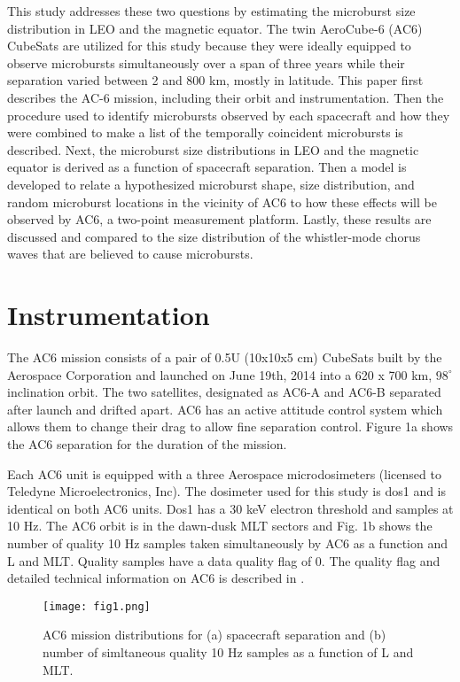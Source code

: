 \documentclass[draft]{agujournal2019}
\begin{document}
This study addresses these two questions by estimating the microburst size distribution in LEO and the magnetic equator. The twin AeroCube-6 (AC6) CubeSats are utilized for this study because they were ideally equipped to observe microbursts simultaneously over a span of three years while their separation varied between 2 and 800 km, mostly in latitude. This paper first describes the AC-6 mission, including their orbit and instrumentation. Then the procedure used to identify microbursts observed by each spacecraft and how they were combined to make a list of the temporally coincident microbursts is described. Next, the microburst size distributions in LEO and the magnetic equator is derived as a function of spacecraft separation. Then a model is developed to relate a hypothesized microburst shape, size distribution, and random microburst locations in the vicinity of AC6 to how these effects will be observed by AC6, a two-point measurement platform. Lastly, these results are discussed and compared to the size distribution of the whistler-mode chorus waves that are believed to cause microbursts. 

\section{Instrumentation}
The AC6 mission consists of a pair of 0.5U (10x10x5 cm) CubeSats built by the Aerospace Corporation and launched on June 19th, 2014 into a 620 x 700 km, $98^\circ$ inclination orbit. The two satellites, designated as AC6-A and AC6-B separated after launch and drifted apart. AC6 has an active attitude control system which allows them to change their drag to allow fine separation control. Figure 1a shows the AC6 separation for the duration of the mission.

Each AC6 unit is equipped with a three Aerospace microdosimeters (licensed to Teledyne Microelectronics, Inc). The dosimeter used for this study is dos1 and is identical on both AC6 units. Dos1 has a 30 keV electron threshold and samples at 10 Hz. The AC6 orbit is in the dawn-dusk MLT sectors and Fig. 1b shows the number of quality 10 Hz samples taken simultaneously by AC6 as a function and L and MLT. Quality samples have a data quality flag of 0. The quality flag and detailed technical information on AC6 is described in .

\begin{figure}
\texttt{[image: fig1.png]}
\caption{AC6 mission distributions for (a) spacecraft separation and (b) number of simltaneous quality 10 Hz samples as a function of L and MLT.} \label{fig1}
\end{figure}
\end{document}
